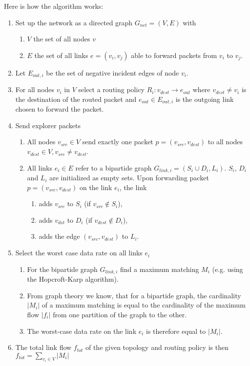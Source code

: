 Here is how the algorithm works:
\begin{enumerate}
\item Set up the network as a directed graph $G_{net}=(V,E)$ with
	\begin{enumerate}
		\item $V$ the set of all nodes $v$
		\item $E$ the set of all links $e=(v_i,v_j)$ able to forward packets from $v_i$ to $v_j$.
	\end{enumerate}
\item Let $E_{out,i}$ be the set of negative incident edges of node $v_i$.
\item For all nodes $v_i$ in $V$ select a routing policy $R_i:v_{dest}\rightarrow e_{out}$ where $v_{dest}\neq v_i$ is the destination of the routed packet and $e_{out} \in E_{out,i}$ is the outgoing link chosen to forward the packet.
\item Send explorer packets
	\begin{enumerate}
		\item All nodes $v_{src}\in V$ send exactly one packet $p=(v_{src},v_{dest})$ to all nodes $v_{dest}	\in V, v_{src}\ne v_{dest}$.
		\item All links $e_i \in E$ refer to a bipartide graph $G_{link,i}=(S_i\cup D_i,L_i)$. $S_i$, $D_i$ and $L_i$ are initialized as empty sets. Upon forwarding packet $p=(v_{src},v_{dest})$ on the link $e_i$, the link
		\begin{enumerate}
			\item adds $v_{src}$ to $S_i$ (if $v_{src}\not\in S_i$),
			\item adds $v_{dst}$ to $D_i$ (if $v_{dest}\not\in D_i$),
			\item adds the edge $(v_{src},v_{dest})$ to $L_i$.
		\end{enumerate}
	\end{enumerate}
	\item Select the worst case data rate on 	all links $e_i$
	\begin{enumerate}
		\item For the bipartide graph $G_{link, i}$ find a maximum matching $M_i$ (e.g. using the Hopcroft-Karp algorithm).
		\item From graph theory we know, that for a bipartide graph, the cardinality $|M_i|$ of a maximum matching is equal to the cardinality of the maximum flow $|f_i|$ from one partition of the graph to the other.
		\item The worst-case data rate on the link $e_i$ is therefore equal to $|M_i|$.
	\end{enumerate}
	\item The total link flow $f_{tot}$ of the given topology and routing policy is then $	f_{tot} = \sum_{v_i\in V} |M_i|$

\end{enumerate}


